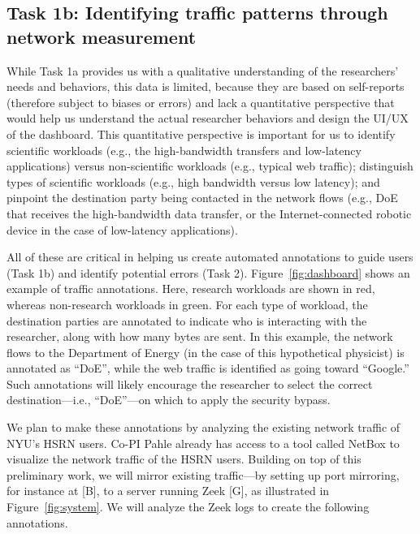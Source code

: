 \subsection{Task 1b: Identifying traffic patterns through network measurement}

While Task 1a provides us with a qualitative understanding of the researchers' needs and behaviors, this data is limited, because they are based on self-reports (therefore subject to biases or errors) and lack a quantitative perspective that would help us understand the actual researcher behaviors and design the UI/UX of the dashboard.
This quantitative perspective is important for us to identify scientific workloads (e.g., the high-bandwidth transfers and low-latency applications) versus non-scientific workloads (e.g., typical web traffic); distinguish types of scientific workloads (e.g., high bandwidth versus low latency); and pinpoint the destination party being contacted in the network flows (e.g., DoE that receives the high-bandwidth data transfer, or the Internet-connected robotic device in the case of low-latency applications).

All of these are critical in helping us create automated annotations to guide users (Task 1b) and identify potential errors (Task 2). Figure~\ref{fig:dashboard} shows an example of traffic annotations. Here, research workloads are shown in red, whereas non-research workloads in green. For each type of workload, the destination parties are annotated to indicate who is interacting with the researcher, along with how many bytes are sent. In this example, the network flows to the Department of Energy (in the case of this hypothetical physicist) is annotated as ``DoE'', while the web traffic is identified as going toward ``Google.'' Such annotations will likely encourage the researcher to select the correct destination---i.e., ``DoE''---on which to apply the security bypass.

We plan to make these annotations by analyzing the existing network traffic of NYU's HSRN users. Co-PI Pahle already has access to a tool called NetBox to visualize the network traffic of the HSRN users. Building on top of this preliminary work, we will mirror existing traffic---by setting up port mirroring, for instance at [B], to a server running Zeek [G], as illustrated in Figure~\ref{fig:system}. We will analyze the Zeek logs to create the following annotations.

